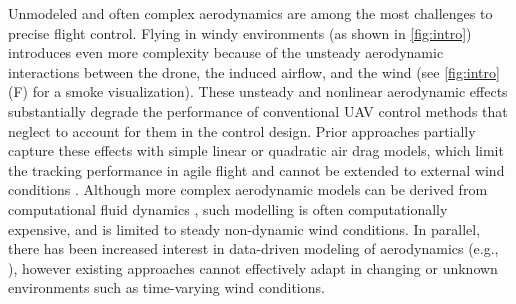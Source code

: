 Unmodeled and often complex aerodynamics are among the most  challenges to precise flight control. 
Flying in windy environments (as shown in \cref{fig:intro}) introduces even more complexity because of the unsteady aerodynamic interactions between the drone, the induced airflow, and the wind (see \cref{fig:intro}(F) for a smoke visualization). These unsteady and nonlinear aerodynamic effects substantially degrade the performance of conventional UAV control methods that neglect to account for them in the control design. Prior approaches partially capture these effects with simple linear or quadratic air drag models, which limit the tracking performance in agile flight and cannot be extended to external wind conditions \cite{foehn2021time,faessler_differential_2018}. 
Although more complex aerodynamic models can be derived from computational fluid dynamics \cite{ventura2018high}, such modelling is often computationally expensive, and is limited to steady non-dynamic wind conditions. 
In parallel, there has been increased interest in data-driven modeling of aerodynamics (e.g., \cite{shi2019neural,shi2020neural,shi2021neural,torrente2021data}),
however existing approaches cannot effectively adapt in changing or unknown environments such as time-varying wind conditions.

